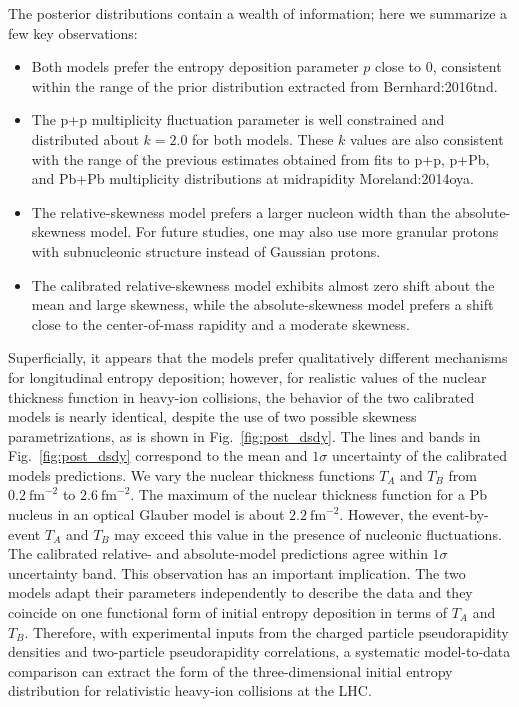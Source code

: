 The posterior distributions contain a wealth of information; here we summarize a few key observations:
\begin{itemize}[itemsep=0pt, leftmargin=2\parindent]
  \item Both models prefer the entropy deposition parameter $p$ close to $0$, consistent within the range of the prior distribution extracted from {Bernhard:2016tnd}.
  \item The p+p multiplicity fluctuation parameter is well constrained and distributed about $k=2.0$ for both models.
    These $k$ values are also consistent with the range of the previous estimates obtained from fits to p+p, p+Pb, and Pb+Pb multiplicity distributions at midrapidity {Moreland:2014oya}.
  \item The relative-skewness model prefers a larger nucleon width than the absolute-skewness model. 
  For future studies, one may also use more granular protons with subnucleonic structure instead of Gaussian protons.
  \item The calibrated relative-skewness model exhibits almost zero shift about the mean and large skewness, while the absolute-skewness model prefers a shift close to the center-of-mass rapidity and a moderate skewness. 
\end{itemize}
Superficially, it appears that the models prefer qualitatively different mechanisms for longitudinal entropy deposition; however, for realistic values of the nuclear thickness function in heavy-ion collisions, the behavior of the two calibrated models is nearly identical, despite the use of two possible skewness parametrizations, as is shown in Fig.~\ref{fig:post_dsdy}.
The lines and bands in Fig.~\ref{fig:post_dsdy} correspond to the mean and $1\sigma$ uncertainty of the calibrated models predictions. 
We vary the nuclear thickness functions $T_A$ and $T_B$ from $0.2~\text{fm}^{-2}$ to $2.6~\text{fm}^{-2}$. The maximum of the nuclear thickness function for a Pb nucleus in an optical Glauber model is about $2.2~\text{fm}^{-2}$. However, the event-by-event $T_A$ and $T_B$ may exceed this value in the presence of nucleonic fluctuations.
The calibrated relative- and absolute-model predictions agree within $1\sigma$ uncertainty band.
This observation has an important implication.
The two models adapt their parameters independently to describe the data and they coincide on one functional form of initial entropy deposition in terms of $T_A$ and $T_B$.
Therefore, with experimental inputs from the charged particle pseudorapidity densities and two-particle pseudorapidity correlations, a systematic model-to-data comparison can extract the form of the three-dimensional initial entropy distribution for relativistic heavy-ion collisions at the LHC.

